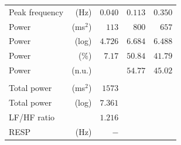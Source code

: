 \begin{table}[!t]
\begin{minipage}[t]{1\linewidth}
\begin{tabular}{lrrrr}
    Peak frequency & (Hz) & $0.040$ & $0.113$ & $0.350$ \\
    Power & (ms${}^\text{2}$) & $113$ & $800$ & $657$ \\
    Power & (log) & $4.726$ & $6.684$ & $6.488$ \\
    Power & (\%) & $7.17$ & $50.84$ & $41.79$ \\
    Power & (n.u.) & & $54.77$ & $45.02$ \\
    \text{-}\text{-}\text{-}\text{-}\text{-}\text{-}\text{-}\text{-}\text{-}\text{-}\text{-}\text{-}\text{-} & & & & \\
    Total power & (ms${}^\text{2}$) & $1573$ & & \\
    Total power & (log) & $7.361$ & & \\
    LF/HF ratio & & $1.216$ & & \\
    RESP & (Hz) & $-$ & & \\
    \bottomrule
    \end{tabular}
  \end{minipage}
  \label{tab:report_real}
\end{table}

